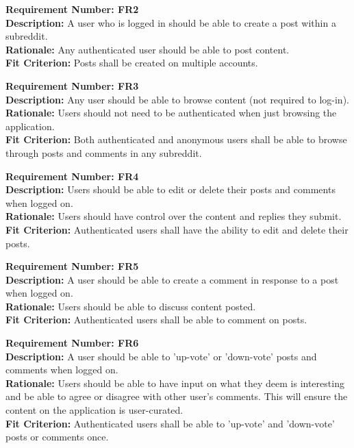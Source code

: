 \documentclass[12pt,fleqn]{article}
\begin{document}
\begin{tcolorbox}
\textbf{Requirement Number: FR2} \\
\textbf{Description:} A user who is logged in should be able to create a post within a subreddit. \\
\textbf{Rationale:} Any authenticated user should be able to post content. \\
\textbf{Fit Criterion:} Posts shall be created on multiple accounts.
\end{tcolorbox}

\begin{tcolorbox}
\textbf{Requirement Number: FR3} \\
\textbf{Description:} Any user should be able to browse content (not required to log-in). \\
\textbf{Rationale:} Users should not need to be authenticated when just browsing the application.\\
\textbf{Fit Criterion:} Both authenticated and anonymous users shall be able to browse through posts and comments in any subreddit.
\end{tcolorbox}

\begin{tcolorbox}
\textbf{Requirement Number: FR4} \\
\textbf{Description:} Users should be able to edit or delete their posts and comments when logged on. \\
\textbf{Rationale:} Users should have control over the content and replies they submit. \\
\textbf{Fit Criterion:} Authenticated users shall have the ability to edit and delete their posts.
\end{tcolorbox}

\begin{tcolorbox}
\textbf{Requirement Number: FR5} \\
\textbf{Description:} A user should be able to create a comment in response to a post when logged on. \\
\textbf{Rationale:} Users should be able to discuss content posted. \\
\textbf{Fit Criterion:} Authenticated users shall be able to comment on posts.
\end{tcolorbox}

\begin{tcolorbox}
\textbf{Requirement Number: FR6} \\
\textbf{Description:} A user should be able to 'up-vote' or 'down-vote' posts and comments when logged on. \\
\textbf{Rationale:} Users should be able to have input on what they deem is interesting and be able to agree or disagree with other user's comments.  This will ensure the content on the application is user-curated. \\
\textbf{Fit Criterion:} Authenticated users shall be able to 'up-vote' and 'down-vote' posts or comments once.
\end{tcolorbox}
\end{document}
